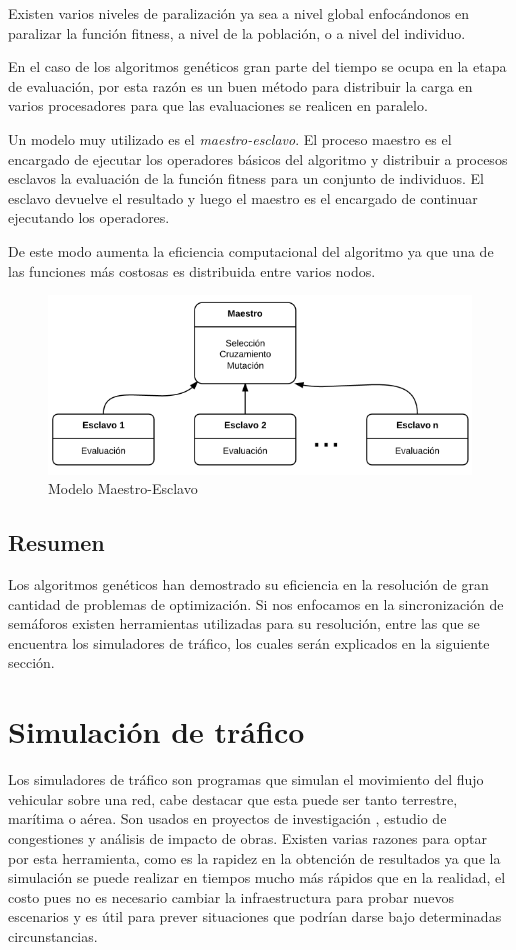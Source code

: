 Existen varios niveles de paralización ya sea a nivel global enfocándonos en paralizar la función fitness, a nivel de la población, o a nivel del individuo. \citep{Nesmachnow2002}

En el caso de los algoritmos genéticos gran parte del tiempo se ocupa en la etapa de evaluación, por esta razón es un buen método para distribuir la carga en varios procesadores para que las evaluaciones se realicen en paralelo. 

Un modelo muy utilizado es el \emph{maestro-esclavo}. El proceso maestro es el encargado de ejecutar los operadores básicos del algoritmo y distribuir a procesos esclavos la evaluación de la función fitness para un conjunto de individuos. El esclavo devuelve el resultado y luego el maestro es el encargado de continuar ejecutando los operadores.

De este modo aumenta la eficiencia computacional del algoritmo ya que una de las funciones más costosas es distribuida entre varios nodos.

\begin{figure}[H]
	\centering
	\includegraphics[width=0.7\linewidth]{Figures/diagrama-master-slave}
	\caption[Modelo Maestro-Esclavo]{Modelo Maestro-Esclavo}
	\label{fig:diagrama-master-slave}
\end{figure}

\subsection{Resumen}
Los algoritmos genéticos han demostrado su eficiencia en la resolución de gran cantidad de problemas de optimización.  Si nos enfocamos en la sincronización de semáforos existen herramientas utilizadas para su resolución, entre las que se encuentra los simuladores de tráfico, los cuales serán explicados en la siguiente sección.


\section{Simulación de tráfico}

Los simuladores de tráfico son programas que simulan el movimiento del flujo vehicular sobre una red, cabe destacar que esta puede ser tanto terrestre, marítima o aérea. Son usados en proyectos de investigación , estudio de congestiones y análisis de impacto de obras.  Existen varias razones para optar por esta herramienta, como es la rapidez en la obtención de resultados ya que la simulación se puede realizar en tiempos mucho más rápidos que en la realidad, el costo pues no es necesario cambiar la infraestructura para probar nuevos escenarios y es útil para prever situaciones que podrían darse bajo determinadas circunstancias.

